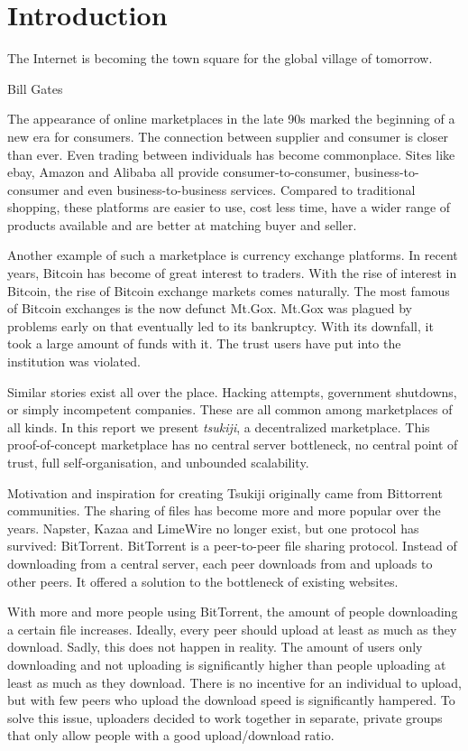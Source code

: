 \section{Introduction}
\epigraph{The Internet is becoming the town square for the global village of tomorrow.}{Bill Gates}

The appearance of online marketplaces in the late 90s marked the beginning of a new era for consumers.
The connection between supplier and consumer is closer than ever.
Even trading between individuals has become commonplace.
Sites like ebay, Amazon and Alibaba all provide consumer-to-consumer, business-to-consumer and even business-to-business services.
Compared to traditional shopping, these platforms are easier to use, cost less time, have a wider range of products available and are better at matching buyer and seller.

Another example of such a marketplace is currency exchange platforms.
In recent years, Bitcoin has become of great interest to traders.
With the rise of interest in Bitcoin, the rise of Bitcoin exchange markets comes naturally.
The most famous of Bitcoin exchanges is the now defunct Mt.Gox.
Mt.Gox was plagued by problems early on that eventually led to its bankruptcy.
With its downfall, it took a large amount of funds with it.
The trust users have put into the institution was violated.

Similar stories exist all over the place. Hacking attempts, government shutdowns, or simply incompetent companies.
These are all common among marketplaces of all kinds.
In this report we present \textit{tsukiji}, a decentralized marketplace.
This proof-of-concept marketplace has no central server bottleneck, no central point of trust, full self-organisation, and unbounded scalability.

Motivation and inspiration for creating Tsukiji originally came from Bittorrent communities.
The sharing of files has become more and more popular over the years.
Napster, Kazaa and LimeWire no longer exist, but one protocol has survived: BitTorrent.
BitTorrent is a peer-to-peer file sharing protocol.
Instead of downloading from a central server, each peer downloads from and uploads to other peers.
It offered a solution to the bottleneck of existing websites.

With more and more people using BitTorrent, the amount of people downloading a certain file increases.
Ideally, every peer should upload at least as much as they download.
Sadly, this does not happen in reality.
The amount of users only downloading and not uploading is significantly higher than people uploading at least as much as they download.
There is no incentive for an individual to upload, but with few peers who upload the download speed is significantly hampered.
To solve this issue, uploaders decided to work together in separate, private groups that only allow people with a good upload/download ratio.

